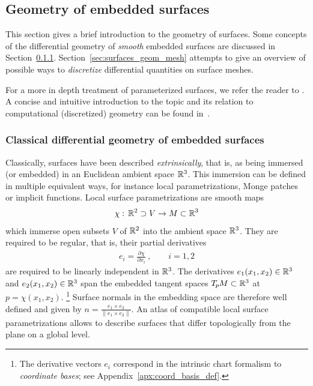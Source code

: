 

\subsection{Geometry of embedded surfaces}
\label{sec:surfaces_geom_main}

This section gives a brief introduction to the geometry of surfaces.
Some concepts of the differential geometry of \emph{smooth} embedded surfaces are discussed in Section~\ref{sec:surfaces_geom_classical_smooth}.
Section~\ref{sec:surfaces_geom_mesh} attempts to give an overview of possible ways to \emph{discretize} differential quantities on surface meshes.

For a more in depth treatment of parameterized surfaces, we refer the reader to \cite{gallier2011geomMethods}.
A concise and intuitive introduction to the topic and its relation to computational (discretized) geometry can be found in~\cite{craneDiscreteDifferentialGeometry2014}.






\subsubsection{Classical differential geometry of embedded surfaces}
\label{sec:surfaces_geom_classical_smooth}

Classically, surfaces have been described \emph{extrinsically}, that is, as being immersed (or embedded) in an Euclidean ambient space $\mathbb{R}^3$.
This immersion can be defined in multiple equivalent ways, for instance local parametrizations, Monge patches or implicit functions.
Local surface parametrizations are smooth maps
\begin{align}
    \chi:\, \mathbb{R}^2 \supset V \to M \subset \mathbb{R}^3
\end{align}
which immerse open subsets $V$ of $\mathbb{R}^2$ into the ambient space $\mathbb{R}^3$.
They are required to be regular, that is, their partial derivatives
\begin{align}
    e_i = \frac{\partial\chi}{\partial x_i}\ ,\qquad i=1,2
\end{align}
are required to be linearly independent in $\mathbb{R}^3$.
The derivatives $e_1(x_1,x_2) \in\mathbb{R}^3$ and $e_2(x_1,x_2) \in\mathbb{R}^3$
span the embedded tangent spaces $T_{\mkern-1.5mu p}\mkern-.5muM \subset \mathbb{R}^3$ at $p=\chi(x_1,x_2)$.%
\footnote{
    The derivative vectors $e_i$ correspond in the intrinsic chart formalism to \emph{coordinate bases}; see Appendix~\ref{apx:coord_basis_def}.
}
Surface normals in the embedding space are therefore well defined and given by $n = \frac{e_1 \times e_2}{\lVert e_1\times e_2\rVert}$.
An atlas of compatible local surface parametrizations allows to describe surfaces that differ topologically from the plane on a global level.


